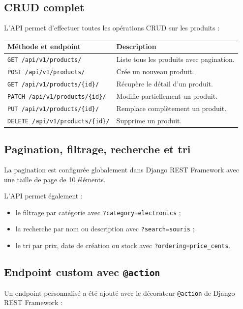 \documentclass[12pt,a4paper]{article}
\begin{document}
\subsection{CRUD complet}

L'API permet d'effectuer toutes les opérations CRUD sur les produits :

\begin{longtable}{|p{4cm}|p{8cm}|}
\hline
\textbf{Méthode et endpoint} & \textbf{Description} \\
\hline
\texttt{GET /api/v1/products/} & Liste tous les produits avec pagination. \\
\hline
\texttt{POST /api/v1/products/} & Crée un nouveau produit. \\
\hline
\texttt{GET /api/v1/products/\{id\}/} & Récupère le détail d'un produit. \\
\hline
\texttt{PATCH /api/v1/products/\{id\}/} & Modifie partiellement un produit. \\
\hline
\texttt{PUT /api/v1/products/\{id\}/} & Remplace complètement un produit. \\
\hline
\texttt{DELETE /api/v1/products/\{id\}/} & Supprime un produit. \\
\hline
\end{longtable}

\subsection{Pagination, filtrage, recherche et tri}

La pagination est configurée globalement dans Django REST Framework avec une taille de page de 10 éléments.

L'API permet également :

\begin{itemize}
    \item le filtrage par catégorie avec \texttt{?category=electronics} ;
    \item la recherche par nom ou description avec \texttt{?search=souris} ;
    \item le tri par prix, date de création ou stock avec \texttt{?ordering=price\_cents}.
\end{itemize}

\subsection{Endpoint custom avec \texttt{@action}}

Un endpoint personnalisé a été ajouté avec le décorateur \texttt{@action} de Django REST Framework :
\end{document}

